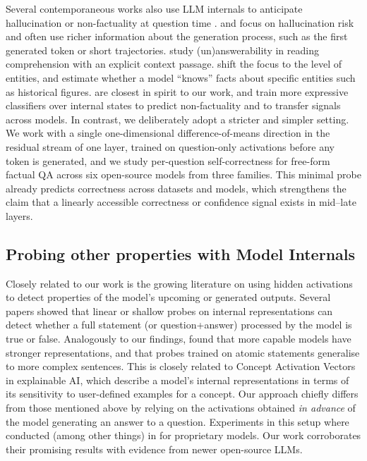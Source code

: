 \documentclass{article} %
\begin{document}
Several contemporaneous works also use LLM internals to anticipate hallucination or non-factuality at question time \citep{snyder2024early,gottesman2024estimating,wang2024hidden,ji2024llm,slobodkin2023curious}. \citet{snyder2024early} and \citet{ji2024llm} focus on hallucination risk and often use richer information about the generation process, such as the first generated token or short trajectories. \citet{slobodkin2023curious} study (un)answerability in reading comprehension with an explicit context passage. \citet{gottesman2024estimating} shift the focus to the level of entities, and estimate whether a model ``knows'' facts about specific entities such as historical figures. \citet{wang2024hidden} are closest in spirit to our work, and train more expressive classifiers over internal states to predict non-factuality and to transfer signals across models. In contrast, we deliberately adopt a stricter and simpler setting. We work with a single one-dimensional difference-of-means direction in the residual stream of one layer, trained on question-only activations before any token is generated, and we study per-question self-correctness for free-form factual QA across six open-source models from three families. This minimal probe already predicts correctness across datasets and models, which strengthens the claim that a linearly accessible correctness or confidence signal exists in mid–late layers.

\subsection{Probing other properties with Model Internals}

Closely related to our work is the growing literature on using hidden activations to detect properties of the model's upcoming or generated outputs. Several papers \citep{burns2022discovering,azaria-mitchell-2023-internal,Marks2023TheGO,burger2024truth, bao2025probing} showed that linear or shallow probes on internal representations can detect whether a full statement (or question+answer) processed by the model is true or false. Analogously to our findings, \citet{bao2025probing} found that more capable models have stronger representations, and that probes trained on atomic statements generalise to more complex sentences.  %
This is closely related to Concept Activation Vectors \citep{kim2018interpretability} in explainable AI, which describe a model's internal representations in terms of its sensitivity to user-defined examples for a concept.
Our approach chiefly differs from those mentioned above by relying on the activations obtained \textit{in advance}  of the model generating an answer to a question. Experiments in this setup where conducted (among other things) in \citet{DBLP:journals/corr/abs-2207-05221} for proprietary models. Our work corroborates their promising results with evidence from newer open-source LLMs.
\end{document}

